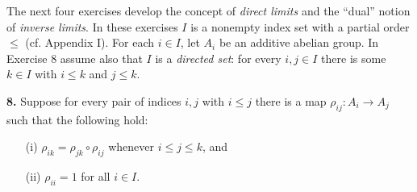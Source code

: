 \documentclass{article}
\theoremstyle{definition}
\theoremstyle{remark}
\begin{document}



\newcommand{\size}[1]{|#1|}
\newcommand{\idx}[2]{[#1 : #2]}
\newcommand{\gen}[1]{\langle #1 \rangle}
\newcommand{\set}[1]{\{#1\}}
\newcommand{\normal}{\trianglelefteq}
\newcommand{\subgroup}{\leq}
\newcommand{\normalizer}[1]{\text{N}_{#1}}
\newcommand{\centerizer}{Z}
\newcommand{\aut}{\text{Aut}}
\newcommand{\inn}{\text{Inn}}
\newcommand{\syl}{\text{Syl}}
\newcommand{\sym}{\text{Sym}}
\newcommand{\alt}{\text{Alt}}
\newcommand{\id}{\text{id}}
\newcommand{\im}{\text{im}}
\newcommand{\orbit}[1]{\mathcal{O}_{#1}}
\newcommand{\ZZ}{\mathbb{Z}}
\newcommand{\C}[1]{\mathbb{Z}/#1\mathbb{Z}}
\newcommand{\iso}{\cong}
\newcommand{\dihedral}[1]{D_{#1}}
\newcommand{\dicyc}{\text{DiC}}
\newcommand{\hol}{\text{Hol}}
\newcommand{\I}[1]{\mathfrak{#1}} 
\newcommand{\Map}{\mathrm{Map}}
\newcommand{\nequiv}{\not \equiv}
\newcommand{\cat}[1]{\mathcal{#1}}
\newcommand{\Cat}{\mathcal{C}}
\newcommand{\Mor}{\text{Mor}}
\newcommand{\Ob}{\text{Ob}}
\newcommand{\End}{\text{End}}
\newcommand{\horline}{\noindent\rule{\textwidth}{1pt} \newline}
\newcommand{\Img}{\mathrm{Im}\ }
\newcommand{\Hom}{\mathrm{Hom}}
\newcommand{\fto}[1]{\overset{#1}{\to}}
\newcommand{\from}{\leftarrow}
\newcommand{\m}[1]{\mathfrak{#1}}
\newcommand{\dual}[1]{#1^{\vee}}
\newcommand{\ddual}[1]{#1^{\vee \vee}}
\newcommand{\rank}{\mathrm{rank}}
\newcommand{\tor}[1]{#1_{\mathrm{tor}}}
\newcommand{\dirlim}{\underrightarrow{\lim}}

The next four exercises develop the concept of \textit{direct limits} and the ``dual'' notion of \textit{inverse limits}. In these exercises $I$ is a nonempty index set with a partial order $\le$ (cf. Appendix I). For each $i \in I$, let $A_i$ be an additive abelian group. In Exercise 8 assume also that $I$ is a \textit{directed set}: for every $i, j \in I$ there is some $k \in I$ with $i \le k$ and $j \le k$.

\bigskip

\noindent \textbf{8.} Suppose for every pair of indices $i, j$ with $i \le j$ there is a map $\rho_{ij} : A_i \to A_j$ such that the following hold:
\begin{enumerate}
    \item[(i)] $\rho_{ik} = \rho_{jk} \circ \rho_{ij}$ whenever $i \le j \le k$, and
    \item[(ii)] $\rho_{ii} = 1$ for all $i \in I$.
\end{enumerate}
\end{document}
